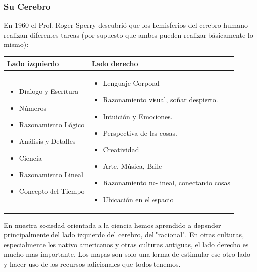 \documentclass{article}
\begin{document}
\subsubsection*{Su Cerebro}
En 1960 el Prof. Roger Sperry descubri\'o que los hemisferios del cerebro humano realizan diferentes tareas (por supuesto que ambos pueden realizar b\'asicamente lo mismo):
\begin{center}
\begin{tabular}{|p{5.5cm}|p{5.5cm}|} \hline
    Lado izquierdo & Lado derecho \\ \hline
    \begin{itemize}
       \item Dialogo y Escritura
       \item N\'umeros
       \item Razonamiento L\'ogico
       \item An\'alisis y Detalles
       \item Ciencia
       \item Razonamiento Lineal
       \item Concepto del Tiempo
    \end{itemize} &
    \begin{itemize}
        \item Lenguaje Corporal
        \item Razonamiento visual, so\~nar despierto.
        \item Intuici\'on y Emociones.
        \item Perspectiva de las cosas.
        \item Creatividad
        \item Arte, M\'usica, Baile
        \item Razonamiento no-lineal, conectando cosas
        \item Ubicaci\'on en el espacio
    \end{itemize}     \\ \hline
\end{tabular}   
\end{center}
En nuestra sociedad orientada a la ciencia hemos aprendido a depender principalmente del lado izquierdo del cerebro, del "racional". En otras culturas, especialmente los nativo americanos y otras culturas antiguas, el lado derecho es mucho mas importante. Los mapas son solo una forma de estimular ese otro lado y hacer uso de los recursos adicionales que todos tenemos.
\end{document}
